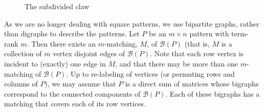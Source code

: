 \documentclass[preprint,12pt]{elsarticle}
\begin{document}
\begin{figure}
\begin{center}
\label{subclaw}
\caption{The subdivided claw}
\end{center}
\end{figure}

As we are no longer dealing with square patterns, we use bipartite graphs, rather than digraphs to describe the patterns. 
Let $P$ be an $m\times n$ pattern with term-rank $m$. Then 
there exists an $m$-matching, $M$, of $\mathcal{B}(P)$ (that is, $M$ is
a collection of $m$ vertex disjoint edges of $\mathcal{B}(P)$. 
Note that each row vertex is incident to 
(exactly) one edge in $M$, and that there may be more than one $m$-matching of $\mathcal{B}(P)$.
Up to re-labeling of vertices
(or permuting rows and columns of $P$),
we may assume that $P$ is a direct sum of 
matrices whose bigraphs correspond to 
the connected components of $\mathcal{B}(P)$.
Each of these bigraphs has a matching that covers each of its row vertices. 
\end{document}
